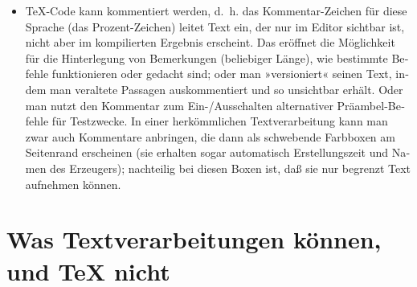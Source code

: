 \documentclass[11pt,a4paper,ngerman,french,DIV=8]{scrartcl}
\begin{document}
\begin{otherlanguage}{ngerman}
\begin{itemize}
  \item \TeX{}-Code kann kommentiert werden, d.~h. das Kommentar-Zeichen für diese Sprache (das Prozent-Zeichen) leitet Text ein, der nur im Editor sichtbar ist, nicht aber im kompilierten Ergebnis erscheint. Das eröffnet die Möglichkeit für die Hinterlegung von Bemerkungen (beliebiger Länge), wie bestimmte Befehle funktionieren oder gedacht sind; oder man »versioniert« seinen Text, indem man veraltete Passagen auskommentiert und so unsichtbar erhält. Oder man nutzt den Kommentar zum Ein-/Ausschalten alternativer Präambel-Befehle für Testzwecke. In einer herkömmlichen Textverarbeitung kann man zwar auch Kommentare anbringen, die dann als schwebende Farbboxen am Seitenrand erscheinen (sie erhalten sogar automatisch Erstellungszeit und Namen des Erzeugers); nachteilig bei diesen Boxen ist, daß sie nur begrenzt Text aufnehmen können.
\end{itemize}

\section{Was Textverarbeitungen können, und \TeX{} nicht}


\end{otherlanguage}
\end{document}
